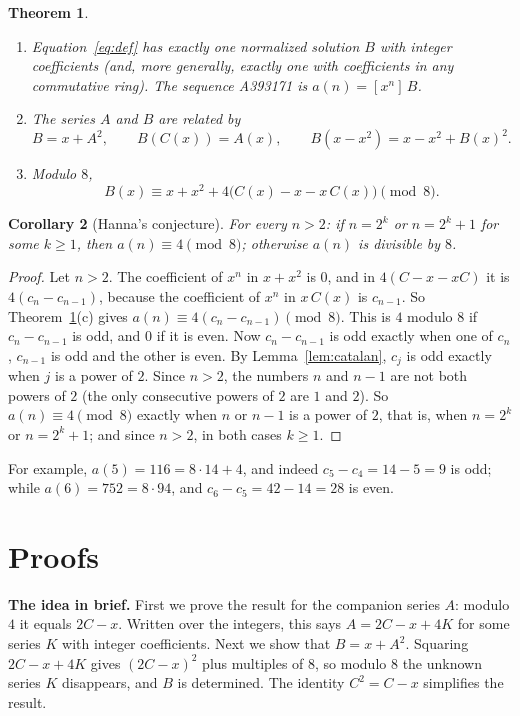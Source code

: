 \documentclass[11pt,a4paper]{article}
\newtheorem{theorem}{Theorem}[section]
\newtheorem{corollary}[theorem]{Corollary}
\theoremstyle{definition}
\theoremstyle{remark}
\newcommand{\coeff}[2]{[x^{#1}]\,#2}
\newcommand{\para}[1]{\par\medskip\noindent\textbf{#1}\enspace}
\begin{document}
\begin{theorem}\label{thm:main}
\begin{enumerate}[label=(\alph*)]
\item Equation~\eqref{eq:def} has exactly one normalized solution $B$ with integer coefficients (and, more generally,
exactly one with coefficients in any commutative ring). The sequence A393171 is $a(n)=\coeff{n}{B}$.
\item The series $A$ and $B$ are related by
\[
B=x+A^2,\qquad B(C(x))=A(x),\qquad B(x-x^2)=x-x^2+B(x)^2 .
\]
\item Modulo $8$,
\[
B(x)\equiv x+x^2+4\bigl(C(x)-x-x\,C(x)\bigr)\pmod 8 .
\]
\end{enumerate}
\end{theorem}

\begin{corollary}[Hanna's conjecture]\label{cor:conj}
For every $n>2$: if $n=2^k$ or $n=2^k+1$ for some $k\ge1$, then $a(n)\equiv4\pmod8$; otherwise $a(n)$ is divisible by
$8$.
\end{corollary}

\begin{proof}
Let $n>2$. The coefficient of $x^n$ in $x+x^2$ is $0$, and in $4(C-x-xC)$ it is $4(c_n-c_{n-1})$, because the
coefficient of $x^n$ in $x\,C(x)$ is $c_{n-1}$. So Theorem~\ref{thm:main}(c) gives $a(n)\equiv4(c_n-c_{n-1})\pmod8$.
This is $4$ modulo $8$ if $c_n-c_{n-1}$ is odd, and $0$ if it is even. Now $c_n-c_{n-1}$ is odd exactly when one of
$c_n$, $c_{n-1}$ is odd and the other is even. By Lemma~\ref{lem:catalan}, $c_j$ is odd exactly when $j$ is a power of
$2$. Since $n>2$, the numbers $n$ and $n-1$ are not both powers of $2$ (the only consecutive powers of $2$ are $1$ and
$2$). So $a(n)\equiv4\pmod8$ exactly when $n$ or $n-1$ is a power of $2$, that is, when $n=2^k$ or $n=2^k+1$; and
since $n>2$, in both cases $k\ge1$.
\end{proof}

For example, $a(5)=116=8\cdot14+4$, and indeed $c_5-c_4=14-5=9$ is odd; while $a(6)=752=8\cdot94$, and
$c_6-c_5=42-14=28$ is even.

\section{Proofs}\label{sec:proofs}

\para{The idea in brief.} First we prove the result for the companion series $A$: modulo $4$ it equals $2C-x$.
Written over the integers, this says $A=2C-x+4K$ for some series $K$ with integer coefficients. Next we show that
$B=x+A^2$. Squaring $2C-x+4K$ gives $(2C-x)^2$ plus multiples of $8$, so modulo $8$ the unknown series $K$ disappears,
and $B$ is determined. The identity $C^2=C-x$ simplifies the result.
\end{document}
